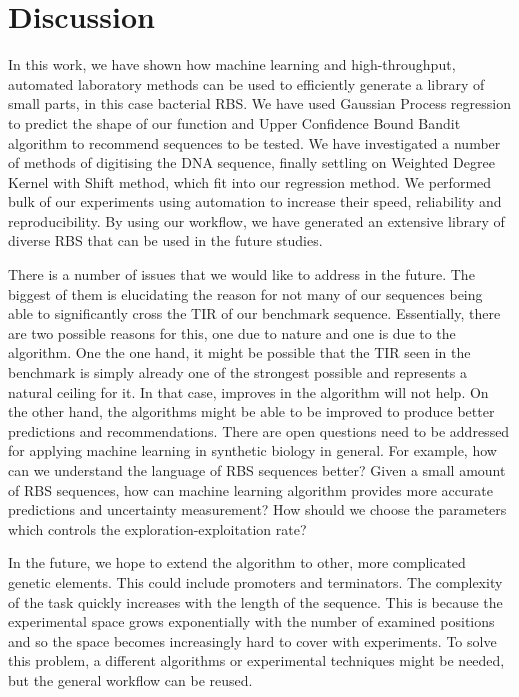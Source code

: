 \documentclass{article}
\begin{document}
\section{Discussion}

In this work, we have shown how machine learning and high-throughput, automated laboratory methods can be used to efficiently generate a library of small parts, in this case bacterial RBS. 
We have used Gaussian Process regression to predict the shape of our function and Upper Confidence Bound Bandit algorithm to recommend sequences to be tested.
We have investigated a number of methods of digitising the DNA sequence, finally settling on Weighted Degree Kernel with Shift method, which fit into our regression method.
We performed bulk of our experiments using automation to increase their speed, reliability and reproducibility.
By using our workflow, we have generated an extensive library of diverse RBS that can be used in the future studies.

There is a number of issues that we would like to address in the future.
The biggest of them is elucidating the reason for not many of our sequences being able to significantly cross the TIR of our benchmark sequence.
Essentially, there are two possible reasons for this, one due to nature and one is due to the algorithm.
One the one hand, it might be possible that the TIR seen in the benchmark is simply already one of the strongest possible and represents a natural ceiling for it. 
In that case, improves in the algorithm will not help.
On the other hand, the algorithms might be able to be improved to produce better predictions and recommendations. 
There are open questions need to be addressed for applying machine learning in synthetic biology in general.
For example, 
how can we understand the language of RBS sequences better?
Given a small amount of RBS sequences, how can machine learning algorithm provides more accurate predictions and uncertainty measurement? 
How should we choose the parameters which controls the exploration-exploitation rate? 

In the future, we hope to extend the algorithm to other, more complicated genetic elements.
This could include promoters and terminators.
The complexity of the task quickly increases with the length of the sequence.
This is because the experimental space grows exponentially with the number of examined positions and so the space becomes increasingly hard to cover with experiments.
To solve this problem, a different algorithms or experimental techniques might be needed, but the general workflow can be reused.
\end{document}
